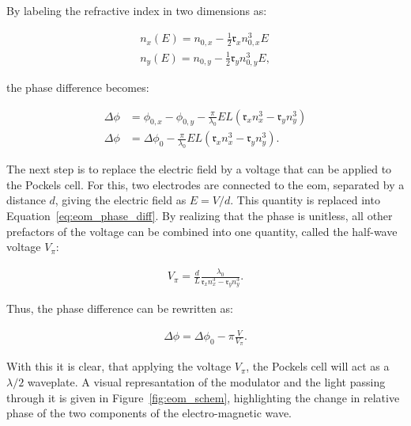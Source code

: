 By labeling the refractive index in two dimensions as:

\begin{align}
	n_x(E) = n_{0,x} - \frac{1}{2} \mathfrak{r}_x n_{0,x}^3 E \\
	n_y(E) = n_{0,y} - \frac{1}{2} \mathfrak{r}_y n_{0,y}^3 E,
\end{align}

the phase difference becomes:

\begin{align}
	\Delta \phi & = \phi_{0,x} - \phi_{0,y} - \frac{\pi}{\lambda_0} E L \left(\mathfrak{r}_x n_x^3 - \mathfrak{r}_y n_y^3\right) \\
	\Delta \phi & = \Delta \phi_{0} - \frac{\pi}{\lambda_0} E L \left(\mathfrak{r}_x n_x^3 - \mathfrak{r}_y n_y^3\right).
	\label{eq:eom_phase_diff}
\end{align}

\begin{figure}[t]%
\end{figure}

The next step is to replace the electric field by a voltage that can be applied to the Pockels cell. For this, two electrodes are connected to the \ac{eom}, separated by a distance $d$, giving the electric field as $E=V/d$. This quantity is replaced into Equation~\ref{eq:eom_phase_diff}. By realizing that the phase is unitless, all other prefactors of the voltage can be combined into one quantity, called the half-wave voltage $V_\pi$:

\begin{align}
	V_\pi = \frac{d}{L} \frac{\lambda_0}{\mathfrak{r}_x n_x^3 - \mathfrak{r}_y n_y^3}.
\end{align}

Thus, the phase difference can be rewritten as:

\begin{align}
	\label{eq:eom_phase_diff}
	\Delta \phi = \Delta \phi_0 - \pi \frac{V}{V_\pi}.
\end{align}

With this it is clear, that applying the voltage $V_\pi$, the Pockels cell will act as a $\lambda/2$ waveplate. A visual represantation of the modulator and the light passing through it is given in Figure~\ref{fig:eom_schem}, highlighting the change in relative phase of the two components of the electro-magnetic wave.

